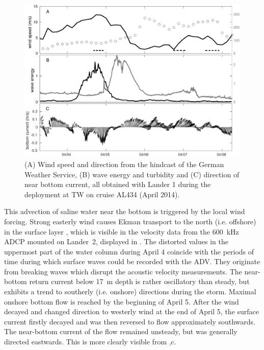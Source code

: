  \begin{figure}[ht]
\includegraphics[width=15cm]{bilder/al434tw.pdf}
 \caption{(A) Wind speed and direction from the hindcast of the German Weather 
Service, (B) wave energy and turbidity and (C) direction of 
near bottom current, all obtained with Lander 1 during the deployment at TW on 
cruise AL434 (April 2014).}
 \label{tromperwiek}
 \end{figure}
 
 This advection of saline water near the bottom is triggered by the local wind 
forcing. Strong easterly wind causes Ekman transport to the north (i.e. 
offshore) in the surface layer \citep[][]{lass2001}, which is visible in the 
velocity data from the 600~kHz ADCP mounted on Lander~2, displayed in 
. The distorted values in the uppermost part of the water column 
during April 4 coincide with the periods of time during which surface waves 
could be recorded with the ADV. They originate from breaking waves which 
disrupt the acoustic velocity measurements. The near-bottom return current below 
17~m depth is rather oscillatory than steady, but exhibits a trend to southerly 
(i.e. onshore) directions during the storm. Maximal onshore bottom flow is 
reached by the beginning of April 5. After the wind decayed and changed 
direction to westerly wind at the end of April 5, the surface current 
firstly decayed and was then reversed to flow approximately southwards. The 
near-bottom current of the flow remained unsteady, but was generally directed 
eastwards. This is more clearly visible from ,c.

